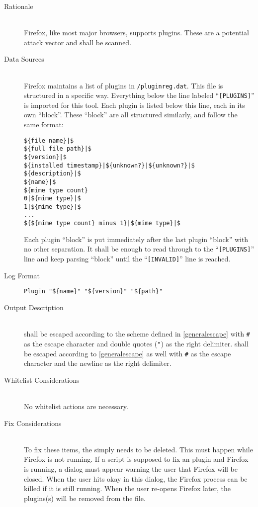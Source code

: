 \begin{description}
\item[Rationale] \hfill \\
Firefox, like most major browsers, supports plugins.  These are a potential
attack vector and shall be scanned.  
\item[Data Sources] \hfill \\
Firefox maintains a list of plugins in \texttt{/pluginreg.dat}.
This file is structured in a specific way.  Everything below the line labeled
``\texttt{[PLUGINS]}'' is imported for this tool.  Each plugin is listed below
this line, each in its own ``block''.  These ``block'' are all structured
similarly, and follow the same format:
\begin{verbatim}
${file name}|$
${full file path}|$
${version}|$
${installed timestamp}|${unknown?}|${unknown?}|$
${description}|$
${name}|$
${mime type count}
0|${mime type}|$
1|${mime type}|$
...
${${mime type count} minus 1}|${mime type}|$
\end{verbatim}
Each plugin ``block'' is put immediately after the last plugin ``block'' with no
other separation.  It shall be enough to read through to the
``\texttt{[PLUGINS]}'' line and keep parsing ``block'' until the
``\texttt{[INVALID]}'' line is reached.
\item[Log Format] \hfill 
\vspace{-\baselineskip}
\begin{verbatim}
Plugin "${name}" "${version}" "${path}"
\end{verbatim}
\item[Output Description] \hfill \\
 shall be escaped according to the scheme
defined in \ref{generalescape} with \verb|#| as the escape character and double
quotes (\verb|"|) as the right delimiter.   shall be escaped
according to \ref{generalescape} as well with \verb|#| as the escape character
and the newline as the right delimiter.  
\item[Whitelist Considerations] \hfill \\
No whitelist actions are necessary.  
\item[Fix Considerations] \hfill \\
To fix these items, the  simply needs to be deleted.  This must
happen while Firefox is not running.  If a script is supposed to fix an
plugin and Firefox is running, a dialog must appear warning the user that
Firefox will be closed.  When the user hits okay in this dialog, the Firefox
process can be killed if it is still running.  When the user re-opens Firefox
later, the plugins(s) will be removed from the file.
\end{description}

